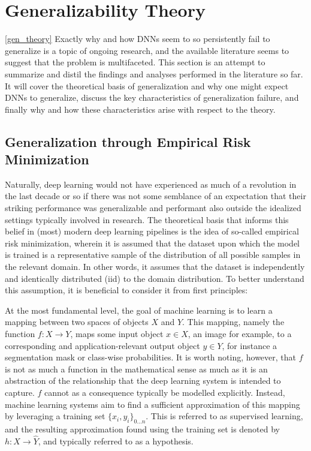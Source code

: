 \section{Generalizability Theory} \ref{gen_theory}
	Exactly why and how DNNs seem to so persistently fail to generalize is a topic of ongoing research, and the available literature seems to suggest that the problem is multifaceted. This section is an attempt to summarize and distil the findings and analyses performed in the literature so far. It will cover the theoretical basis of generalization and why one might expect DNNs to generalize, discuss the key characteristics of generalization failure, and finally why and how these characteristics arise with respect to the theory.
	
	\subsection{Generalization through Empirical Risk Minimization} 
		Naturally, deep learning would not have experienced as much of a revolution in the last decade or so if there was not some semblance of an expectation that their striking performance was generalizable and performant also outside the idealized settings typically involved in research. The theoretical basis that informs this belief in (most) modern deep learning pipelines is the idea of so-called empirical risk minimization, wherein it is assumed that the dataset upon which the model is trained is a representative sample of the distribution of all possible samples in the relevant domain. In other words, it assumes that the dataset is independently and identically distributed (iid) to the domain distribution. To better understand this assumption, it is beneficial to consider it from first principles: 
		
		At the most fundamental level, the goal of machine learning is to learn a mapping between two spaces of objects \(X\) and \(Y\). This mapping, namely the function \(f: X \rightarrow Y\), maps some input object \(x \in X\), an image for example, to a corresponding and application-relevant output object \(y \in Y\), for instance a segmentation mask or class-wise probabilities. It is worth noting, however, that \(f\) is not as much a function in the mathematical sense as much as it is an abstraction of the relationship that the deep learning system is intended to capture. \(f\) cannot as a consequence typically be modelled explicitly. Instead, machine learning systems aim to find a sufficient approximation of this mapping by leveraging a training set \(\{x_i, y_i\}_{0...n}\). This is referred to as supervised learning, and the resulting approximation found using the training set is denoted by \(h: X \rightarrow \hat{Y}\), and typically referred to as a hypothesis.  
		        
